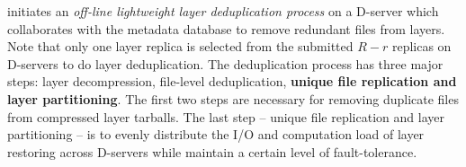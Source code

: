  \sysname initiates an \emph{off-line lightweight layer deduplication process} on a D-server 
 which collaborates with the metadata database
 to remove redundant files from layers. 
 Note that only one layer replica is selected from the submitted $R-r$ replicas on D-servers to do layer deduplication.
The deduplication process has three major steps: 
layer decompression, 
file-level deduplication,
\textbf{unique file replication and layer partitioning}. 
The first two steps are necessary for removing duplicate files from compressed layer tarballs.
%
The last step -- unique file replication and layer partitioning -- is 
to evenly distribute the I/O and computation load of layer restoring across D-servers 
while maintain a certain level of fault-tolerance.  





%

